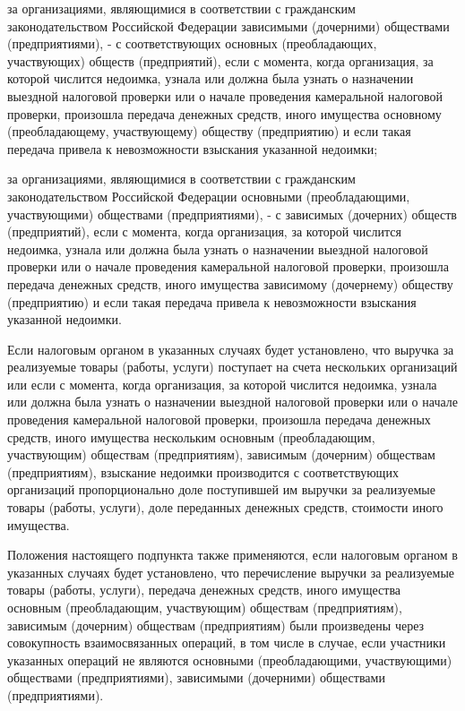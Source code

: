 \documentclass[a4page]{report}
\begin{document}
\par за организациями, являющимися в соответствии с гражданским законодательством Российской Федерации зависимыми (дочерними) обществами (предприятиями), - с соответствующих основных (преобладающих, участвующих) обществ (предприятий), если с момента, когда организация, за которой числится недоимка, узнала или должна была узнать о назначении выездной налоговой проверки или о начале проведения камеральной налоговой проверки, произошла передача денежных средств, иного имущества основному (преобладающему, участвующему) обществу (предприятию) и если такая передача привела к невозможности взыскания указанной недоимки;
\par за организациями, являющимися в соответствии с гражданским законодательством Российской Федерации основными (преобладающими, участвующими) обществами (предприятиями), - с зависимых (дочерних) обществ (предприятий), если с момента, когда организация, за которой числится недоимка, узнала или должна была узнать о назначении выездной налоговой проверки или о начале проведения камеральной налоговой проверки, произошла передача денежных средств, иного имущества зависимому (дочернему) обществу (предприятию) и если такая передача привела к невозможности взыскания указанной недоимки.
\par Если налоговым органом в указанных случаях будет установлено, что выручка за реализуемые товары (работы, услуги) поступает на счета нескольких организаций или если с момента, когда организация, за которой числится недоимка, узнала или должна была узнать о назначении выездной налоговой проверки или о начале проведения камеральной налоговой проверки, произошла передача денежных средств, иного имущества нескольким основным (преобладающим, участвующим) обществам (предприятиям), зависимым (дочерним) обществам (предприятиям), взыскание недоимки производится с соответствующих организаций пропорционально доле поступившей им выручки за реализуемые товары (работы, услуги), доле переданных денежных средств, стоимости иного имущества.
\par Положения настоящего подпункта также применяются, если налоговым органом в указанных случаях будет установлено, что перечисление выручки за реализуемые товары (работы, услуги), передача денежных средств, иного имущества основным (преобладающим, участвующим) обществам (предприятиям), зависимым (дочерним) обществам (предприятиям) были произведены через совокупность взаимосвязанных операций, в том числе в случае, если участники указанных операций не являются основными (преобладающими, участвующими) обществами (предприятиями), зависимыми (дочерними) обществами (предприятиями).
\end{document}
